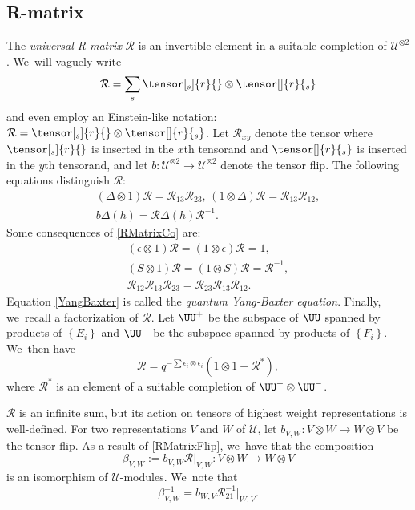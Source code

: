 \subsection{R-matrix}\label{RMatrix}
The \textit{universal R-matrix} $\mathcal{R}$ is an invertible element in a suitable completion of $\mathcal{U}^{\otimes 2}$. We~will vaguely write
\[
\mathcal{R}=\sum_s\tensor[_s]{r}{}\otimes \tensor[]{r}{_s}
\]
and even employ an Einstein-like notation: $\mathcal{R}=\tensor[_s]{r}{}\otimes \tensor[]{r}{_s}$.
Let $\mathcal{R}_{xy}$ denote the tensor where $\tensor[_s]{r}{}$ is inserted in the $x$th tensorand and $\tensor[]{r}{_s}$ is inserted in the $y$th tensorand, and let $b:\mathcal{U}^{\otimes 2}\to\mathcal{U}^{\otimes 2}$ denote the tensor flip.
The following equations distinguish $\mathcal{R}$:
\begin{gather}
(\Delta\otimes 1)\mathcal{R}=\mathcal{R}_{13}\mathcal{R}_{23},\,(1\otimes\Delta)\mathcal{R}=\mathcal{R}_{13}\mathcal{R}_{12},\label{RMatrixCo}\\
b\Delta(h)=\mathcal{R}\Delta(h)\mathcal{R}^{-1}.\label{RMatrixFlip}
\end{gather}
Some consequences of \eqref{RMatrixCo} are:
\begin{gather}
(\epsilon\otimes 1)\mathcal{R}=(1\otimes\epsilon)\mathcal{R}=1\label{RMatrixCounit},\\
(S\otimes 1)\mathcal{R}=(1\otimes S)\mathcal{R}=\mathcal{R}^{-1}\label{RMatrixInverse},\\
\mathcal{R}_{12}\mathcal{R}_{13}\mathcal{R}_{23}=\mathcal{R}_{23}\mathcal{R}_{13}\mathcal{R}_{12}.\label{YangBaxter}
\end{gather}
Equation \eqref{YangBaxter} is called the \textit{quantum Yang-Baxter equation}.
Finally, we~recall a factorization of $\mathcal{R}$.
Let $\UU^+$ be the subspace of $\UU$ spanned by products of $\left\{ E_i \right\}$ and $\UU^-$ be the subspace spanned by products of $\left\{ F_i \right\}$. We~then have
\begin{equation}
\mathcal{R}=q^{-\sum \epsilon_i\otimes \epsilon_i}(1\otimes 1+\mathcal{R}^*),
\label{RFactor}
\end{equation}
where $\mathcal{R}^*$ is an element of a suitable completion of $\UU^+\otimes\UU^-$.

$\mathcal{R}$ is an infinite sum, but its action on tensors of highest weight representations is well-defined.
For two representations $V$ and $W$ of $\mathcal{U}$, let $b_{V,W}:V\otimes W\to W\otimes V$ be the tensor flip.
As a result of \eqref{RMatrixFlip}, we~have that the composition
\[
\beta_{V,W}:=b_{V,W}\mathcal{R}\big|_{V,W}:V\otimes W\to W\otimes V
\]
is an isomorphism of $\mathcal{U}$-modules. We~note that
\[
\beta_{V,W}^{-1} = b_{W, V}\mathcal{R}^{-1}_{21}\big|_{W,V}.
\]


